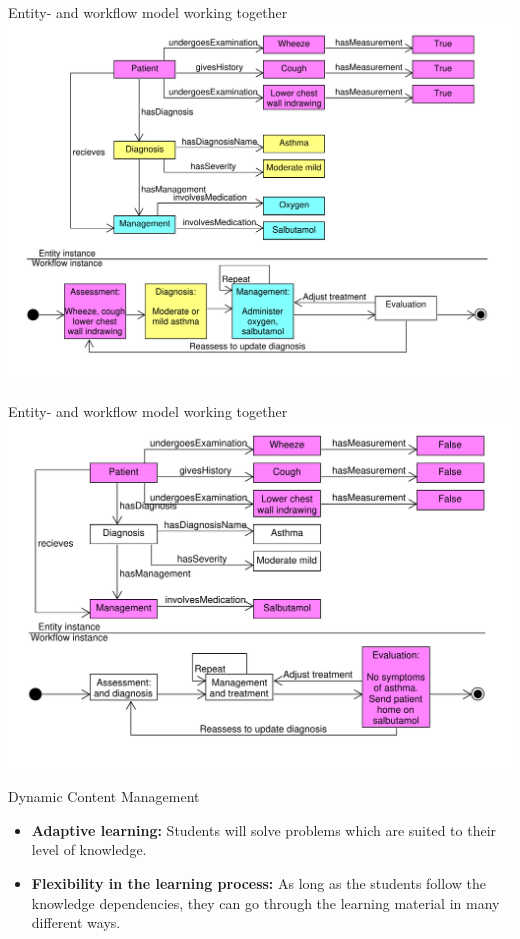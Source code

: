 \documentclass{beamer}
\begin{document}
\begin{frame}{Entity- and workflow model working together}
\includegraphics[scale=0.40]{Integrated1}
\end{frame}

\begin{frame}{Entity- and workflow model working together	}
\includegraphics[scale=0.45]{Integrated2}
\end{frame}

\begin{frame}{Dynamic Content Management}
\begin{itemize}
	\item \textbf{Adaptive learning:} Students will solve problems which are suited to their level of knowledge.
	\item \textbf{Flexibility in the learning process:} As long as the students follow the knowledge dependencies, they can go through the learning material in many different ways.
\end{itemize}
\end{frame}
\end{document}
